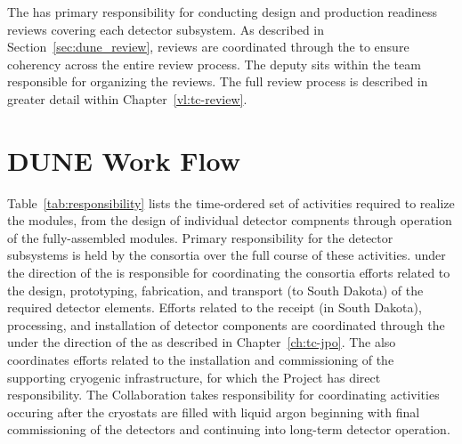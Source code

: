 The  has primary responsibility for conducting design
and production readiness reviews covering each detector subsystem.
As described in Section~\ref{sec:dune_review}, reviews are coordinated
through the  to ensure coherency across the entire review
process.  The deputy  sits within the  team
responsible for organizing the reviews.  The full review process is
described in greater detail within Chapter~\ref{vl:tc-review}.

\section{DUNE Work Flow}
\label{sec:workflow}

Table~\ref{tab:responsibility} lists the time-ordered set of activities 
required to realize the   modules, from the design 
of individual detector compnents through operation of the fully-assembled 
modules.  Primary responsibility for the detector subsystems is held 
by the  consortia over the full course of these activities.
  under the direction of the  is 
responsible for coordinating the consortia efforts related to the design, 
prototyping, fabrication, and transport (to South Dakota) of the required 
detector elements.  Efforts related to the receipt (in South Dakota), 
processing, and installation of detector components are coordinated 
through the  under the direction of the  as 
described in Chapter~\ref{ch:tc-jpo}.  The  also coordinates 
efforts related to the installation and commissioning of the supporting
cryogenic infrastructure, for which the  Project has direct 
responsibility.  The  Collaboration takes responsibility 
for coordinating activities occuring after the cryostats are filled 
with liquid argon beginning with final commissioning of the detectors 
and continuing into long-term detector operation.
